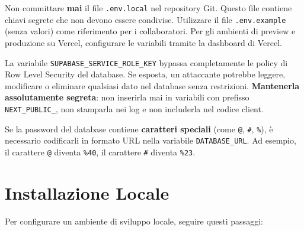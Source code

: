 \documentclass[a4paper,11pt,oneside]{book}
\begin{document}
\begin{warningbox}
Non committare \textbf{mai} il file \texttt{.env.local} nel repository Git. Questo file contiene chiavi segrete che non devono essere condivise. Utilizzare il file \texttt{.env.example} (senza valori) come riferimento per i collaboratori. Per gli ambienti di preview e produzione su Vercel, configurare le variabili tramite la dashboard di Vercel.
\end{warningbox}

\begin{dangerbox}
La variabile \texttt{SUPABASE\_SERVICE\_ROLE\_KEY} bypassa completamente le policy di Row Level Security del database. Se esposta, un attaccante potrebbe leggere, modificare o eliminare qualsiasi dato nel database senza restrizioni. \textbf{Mantenerla assolutamente segreta}: non inserirla mai in variabili con prefisso \texttt{NEXT\_PUBLIC\_}, non stamparla nei log e non includerla nel codice client.
\end{dangerbox}

\begin{infobox}
Se la password del database contiene \textbf{caratteri speciali} (come \texttt{@}, \texttt{\#}, \texttt{\%}), \`e necessario codificarli in formato URL nella variabile \texttt{DATABASE\_URL}. Ad esempio, il carattere \texttt{@} diventa \texttt{\%40}, il carattere \texttt{\#} diventa \texttt{\%23}.
\end{infobox}

\section{Installazione Locale}
\label{sec:installazione-locale}

Per configurare un ambiente di sviluppo locale, seguire questi passaggi:
\end{document}
